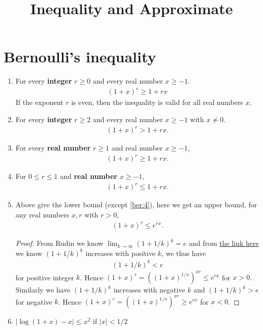 \documentclass{article}
\title{Inequality and Approximate}
\begin{document}
\maketitle


\section{Bernoulli's inequality}
\begin{enumerate}
    \item For every \textbf{integer} $r\ge 0$ and every real number $x\ge -1$. \begin{align}
        (1+x)^{r} \geq 1+r x \label{ber:1}
    \end{align}
    If the exponent $r$ is even, then the inequality is valid for all real numbers $x$.
    \item For every \textbf{integer} $r \geq 2$ and every real number $x \geq-1$ with $x \neq 0$. \begin{align}
        (1+x)^{r}>1+r x. \label{ber:2}
    \end{align}
    \item For every \textbf{real number} $r \geq 1$ and real number $x \geq-1$, \begin{align}
        (1+x)^{r} \geq 1+r x. \label{ber:3}
    \end{align}
    \item For $0 \leq r \leq 1$ and \textbf{real number} $x \geq-1$, \begin{align}
        (1+x)^{r} \leq 1+r x. \label{ber:4}
    \end{align}
    \item Above give the lower bound (except \cref{ber:4}), here we get an upper bound,  for any real numbers $x, r$ with $r> 0$, \begin{align}
        (1+x)^{r}\leq e^{rx}.\label{ber:5}
    \end{align}
    \begin{proof}
    From Rudin\cite{rudin1976principles} we know $\lim_{k\to\infty}(1+1/k)^k=e$ and from \href{https://math.stackexchange.com/questions/167843/show-that-left1-dfrac1n-rightn-is-monotonically-increasing}{the link here} we know $(1+1/k)^k$ increases with positive $k$, we thus have
    \begin{align}
        (1+1/k)^k<e \label{ber:5a}
    \end{align} for positive integer $k$. Hence $(1+x)^{r}=\left((1+x)^{1/x}\right)^{xr}\le e^{rx}$ for $x>0$. Similarly we have $(1+1/k)^k$ increases with negative $k$ and $(1+1/k)^k>e$ for negative $k$. Hence $(1+x)^{r}=\left((1+x)^{1/x}\right)^{xr}\ge e^{rx}$ for $x<0$.
    \end{proof}
    \item $\left|\log (1+x)-x \right|\le x^2$ if  $|x|< 1/2$
\end{enumerate}
\end{document}
